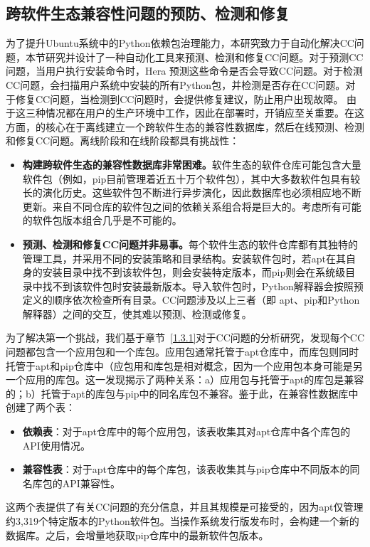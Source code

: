 \subsection{跨软件生态兼容性问题的预防、检测和修复}
为了提升Ubuntu系统中的Python依赖包治理能力，本研究致力于自动化解决CC问题，本节研究并设计了一种自动化工具\tool{}来预测、检测和修复CC问题。对于预测CC问题，当用户执行安装命令时，Hera
预测这些命令是否会导致CC问题。对于检测CC问题，\tool{}会扫描用户系统中安装的所有Python包，并检测是否存在CC问题。对于修复CC问题，当检测到CC问题时，\tool{}会提供修复建议，防止用户出现故障。
由于这三种情况都在用户的生产环境中工作，因此在部署\tool{}时，开销应至关重要。在这方面，\tool{}的核心在于离线建立一个跨软件生态的兼容性数据库，然后在线预测、检测和修复CC问题。离线阶段和在线阶段都具有挑战性：
\begin{itemize}
	\item \textbf{构建跨软件生态的兼容性数据库非常困难。}软件生态的软件仓库可能包含大量软件包（例如，pip目前管理着近五十万个软件包），其中大多数软件包具有较长的演化历史。这些软件包不断进行异步演化，因此数据库也必须相应地不断更新。来自不同仓库的软件包之间的依赖关系组合将是巨大的。考虑所有可能的软件包版本组合几乎是不可能的。
	\item\textbf{ 预测、检测和修复CC问题并非易事。}每个软件生态的软件仓库都有其独特的管理工具，并采用不同的安装策略和目录结构。安装软件包时，若apt在其自身的安装目录中找不到该软件包，则会安装特定版本，而pip则会在系统级目录中找不到该软件包时安装最新版本。导入软件包时，Python解释器会按照预定义的顺序依次检查所有目录。CC问题涉及以上三者（即 apt、pip和Python解释器）之间的交互，使其难以预测、检测或修复。
\end{itemize}

为了解决第一个挑战，我们基于章节~\ref{1.3.1}对于CC问题的分析研究，发现每个CC问题都包含一个应用包和一个库包。应用包通常托管于apt仓库中，而库包则同时托管于apt和pip仓库中（应包用和库包是相对概念，因为一个应用包本身可能是另一个应用的库包。这一发现揭示了两种关系：a）应用包与托管于apt的库包是兼容的；b）托管于apt的库包与pip中的同名库包不兼容。鉴于此，\tool{}在兼容性数据库中创建了两个表：
\begin{itemize}
	\item \textbf{依赖表}：对于apt仓库中的每个应用包，该表收集其对apt仓库中各个库包的API使用情况。
	\item\textbf{兼容性表}：对于apt仓库中的每个库包，该表收集其与pip仓库中不同版本的同名库包的API兼容性。
\end{itemize}
这两个表提供了有关CC问题的充分信息，并且其规模是可接受的，因为apt仅管理约3,319个特定版本的Python软件包。当操作系统发行版发布时，\tool{}会构建一个新的数据库。之后，\tool{}会增量地获取pip仓库中的最新软件包版本。

